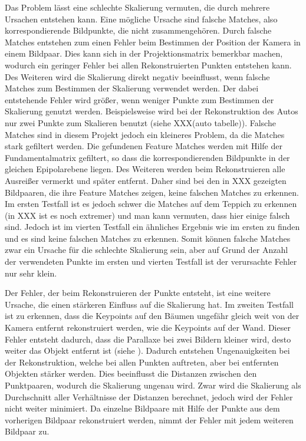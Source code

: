Das Problem lässt eine schlechte Skalierung vermuten, die durch mehrere Ursachen entstehen kann. 
Eine mögliche Ursache sind falsche Matches, also korrespondierende Bildpunkte, die nicht zusammengehören.
Durch falsche Matches entstehen zum einen Fehler beim Bestimmen der Position der Kamera in einem Bildpaar.
Dies kann sich in der Projektionsmatrix bemerkbar machen, wodurch ein geringer Fehler bei allen Rekonstruierten Punkten entstehen kann.
Des Weiteren wird die Skalierung direkt negativ beeinflusst, wenn falsche Matches zum Bestimmen der Skalierung verwendet werden. 
Der dabei entstehende Fehler wird größer, wenn weniger Punkte zum Bestimmen der Skalierung genutzt werden.
Beispielsweise wird bei der Rekonstruktion des Autos nur zwei Punkte zum Skalieren benutzt (siehe XXX(auto tabelle)).
Falsche Matches sind in diesem Projekt jedoch ein kleineres Problem, da die Matches stark gefiltert werden.
Die gefundenen Feature Matches werden mit Hilfe der Fundamentalmatrix gefiltert, so dass die korrespondierenden Bildpunkte in der gleichen Epipolarebene liegen.
Des Weiteren werden beim Rekonstruieren alle Ausreißer vermerkt und später entfernt.
Daher sind bei den in XXX gezeigten Bildpaaren, die ihre Feature Matches zeigen, keine falschen Matches zu erkennen.
Im ersten Testfall ist es jedoch schwer die Matches auf dem Teppich zu erkennen (in XXX ist es noch extremer) und man kann vermuten, dass hier einige falsch sind.
Jedoch ist im vierten Testfall ein ähnliches Ergebnis wie im ersten zu finden und es sind keine falschen Matches zu erkennen.
Somit können falsche Matches zwar ein Ursache für die schlechte Skalierung sein, aber auf Grund der Anzahl der verwendeten Punkte im ersten und vierten Testfall ist der verursachte Fehler nur sehr klein.

Der Fehler, der beim Rekonstruieren der Punkte entsteht, ist eine weitere Ursache, die einen stärkeren Einfluss auf die Skalierung hat. 
Im zweiten Testfall ist zu erkennen, dass die Keypoints auf den Bäumen ungefähr gleich weit von der Kamera entfernt rekonstruiert werden, wie die Keypoints auf der Wand.
Dieser Fehler entsteht dadurch, dass die Parallaxe bei zwei Bildern kleiner wird, desto weiter das Objekt entfernt ist (siehe ). %
Dadurch entstehen Ungenauigkeiten bei der Rekonstruktion, welche bei allen Punkten auftreten, aber bei entfernten Objekten stärker werden. %
Dies beeinflusst die Distanzen zwischen den Punktpaaren, wodurch die Skalierung ungenau wird.
Zwar wird die Skalierung als Durchschnitt aller Verhältnisse der Distanzen berechnet, jedoch wird der Fehler nicht weiter minimiert.
Da einzelne Bildpaare mit Hilfe der Punkte aus dem vorherigen Bildpaar rekonstruiert werden, nimmt der Fehler mit jedem weiteren Bildpaar zu. 

